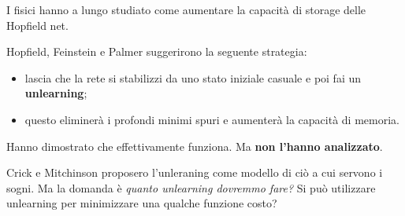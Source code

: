 \begin{figure}
\centering     %
{}
\end{figure}
\newpage
I fisici hanno a lungo studiato come aumentare la capacità di storage delle Hopfield net. 



Hopfield, Feinstein e Palmer suggerirono la seguente strategia:
\begin{itemize}
    \item lascia che la rete si stabilizzi da uno stato iniziale casuale e poi fai un \textbf{unlearning};
    \item questo eliminerà i profondi minimi spuri e aumenterà la capacità di memoria.
\end{itemize}
Hanno dimostrato che effettivamente funziona. Ma \textbf{non l'hanno analizzato}.

Crick e Mitchinson proposero l'unleraning come modello di ciò a cui servono i sogni. Ma la domanda è \textit{quanto unlearning dovremmo fare?} Si può utilizzare unlearning per minimizzare una qualche funzione costo?


